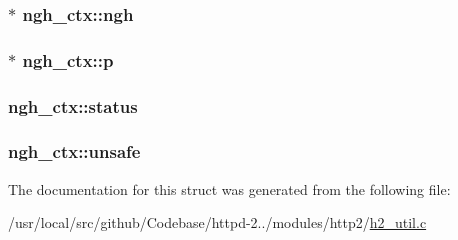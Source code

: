 \subsubsection[{\texorpdfstring{ngh}{ngh}}]{$\ast$ ngh\+\_\+ctx\+::ngh}\hypertarget{structngh__ctx_a809b1fed74e8aa3f35a8c9441d86f7cb}{}\label{structngh__ctx_a809b1fed74e8aa3f35a8c9441d86f7cb}
\subsubsection[{\texorpdfstring{p}{p}}]{$\ast$ ngh\+\_\+ctx\+::p}\hypertarget{structngh__ctx_a2e5a2a8843c2e6995f8fbbf0dad36635}{}\label{structngh__ctx_a2e5a2a8843c2e6995f8fbbf0dad36635}
\subsubsection[{\texorpdfstring{status}{status}}]{ ngh\+\_\+ctx\+::status}\hypertarget{structngh__ctx_a1055063d6872439776f6f4224b0b2264}{}\label{structngh__ctx_a1055063d6872439776f6f4224b0b2264}
\subsubsection[{\texorpdfstring{unsafe}{unsafe}}]{ ngh\+\_\+ctx\+::unsafe}\hypertarget{structngh__ctx_aca05bc87c3cdbade4a186c449e8b33b0}{}\label{structngh__ctx_aca05bc87c3cdbade4a186c449e8b33b0}


The documentation for this struct was generated from the following file\+:\begin{DoxyCompactItemize}
\item 
/usr/local/src/github/\+Codebase/httpd-\/2../modules/http2/\hyperlink{h2__util_8c}{h2\+\_\+util.\+c}\end{DoxyCompactItemize}
